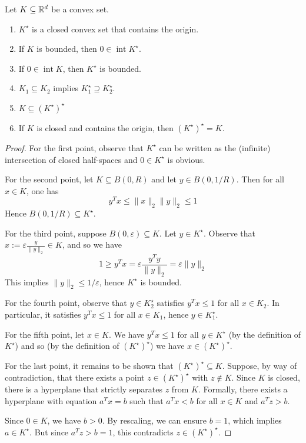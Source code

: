 \begin{lemma}
  Let $K \subseteq \mathbb{R}^d$ be a convex set.
  \begin{enumerate}
    \item $K^\star$ is a closed convex set that contains the origin.
    \item If $K$ is bounded, then $0 \in \operatorname{int} K^\star$.
    \item If $0 \in \operatorname{int} K$, then $K^\star$ is bounded.
    \item $K_1 \subseteq K_2$ implies $K_1^\star \supseteq K_2^\star$.
    \item $K \subseteq (K^\star)^\star$
    \item If $K$ is closed and contains the origin, then $(K^\star)^\star = K$.
  \end{enumerate}
\end{lemma}
\begin{proof}
  For the first point, observe that $K^\star$ can be written as the (infinite) intersection
  of closed half-spaces and $0 \in K^\star$ is obvious.

  For the second point, let $K \subseteq B(0, R)$
  and let $y \in B(0, 1/R)$.
  Then for all $x \in K$, one has
  \[
    y^T x \leq \|x\|_2 \|y\|_2 \leq 1
  \]
  Hence $B(0,1/R) \subseteq K^\star$.

  For the third point, suppose $B(0,\varepsilon) \subseteq K$.
  Let $y \in K^\star$.
  Observe that $x := \varepsilon \frac{y}{\|y\|_2} \in K$,
  and so we have
  \[
    1 \geq y^Tx = \varepsilon \frac{y^Ty}{\|y\|_2} = \varepsilon \|y\|_2
  \]
  This implies $\|y\|_2 \leq 1/\varepsilon$, hence $K^\star$ is bounded.

  For the fourth point, observe that $y \in K_2^\star$
  satisfies $y^Tx \leq 1$ for all $x \in K_2$.
  In particular, it satisfies $y^Tx \leq 1$ for all $x \in K_1$,
  hence $y \in K_1^\star$.

  For the fifth point,
  let $x \in K$.
  We have $y^Tx \leq 1$ for all $y \in K^\star$ (by the definition of $K^\star$)
  and so (by the definition of $(K^\star)^\star$) we have $x \in (K^\star)^\star$.

  For the last point,
  it remains to be shown that $(K^\star)^\star \subseteq K$.
  Suppose, by way of contradiction,
  that there exists a point $z \in (K^\star)^\star$ with $z \not\in K$.
  Since $K$ is closed,
  there is a hyperplane that strictly separates $z$ from $K$.
  Formally, there exists a hyperplane with equation $a^Tx = b$
  such that $a^Tx < b$ for all $x \in K$ and $a^Tz > b$.

  Since $0 \in K$, we have $b > 0$.
  By rescaling, we can ensure $b = 1$, which implies $a \in K^\star$.
  But since $a^Tz > b = 1$, this contradicts $z \in (K^\star)^\star$.
\end{proof}

